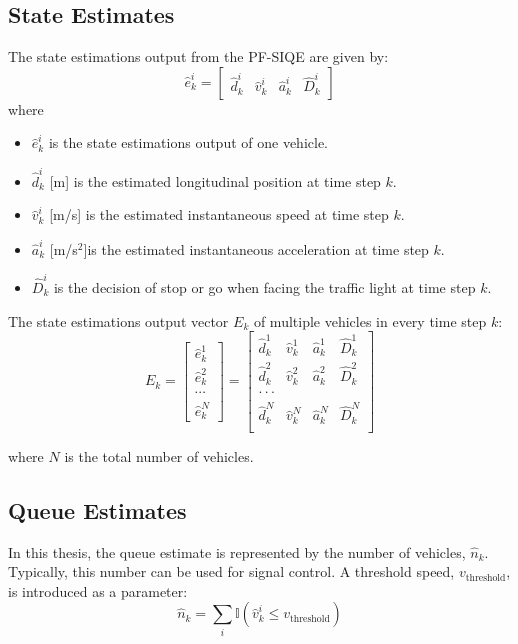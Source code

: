 \subsection{State Estimates}
The state estimations output from the PF-SIQE are given by:
\begin{equation}\label{state estimates}
   \hat{e}_k^i = \begin{bmatrix}
\hat{d}_k^i & \hat{v}_k^i & \hat{a}_k^i & \hat{D}_k^i  
\end{bmatrix}
\end{equation}
where
\begin{itemize}
    \item $\hat{e}_k^i$ is the state estimations output of one vehicle.
    \item \(\hat{d}_k^i\) [m] is the estimated longitudinal position at time step \(k\).
    \item \(\hat{v}_k^i\) [m/s] is the estimated instantaneous speed at time step \(k\).
    \item \(\hat{a}_k^i\) [m/s$^2$]is the estimated instantaneous acceleration at time step \(k\).
    \item $\hat{D}_k^i$ is the decision of stop or go when facing the traffic light at time step \(k\).
\end{itemize}
The state estimations output vector \( E_k \) of multiple vehicles in every time step $k$:
\begin{equation}
    E_k = \begin{bmatrix}
\hat e_k^1 \\
\hat e_k^2 \\
\cdots \\
\hat e_k^N 
\end{bmatrix}
= \begin{bmatrix}
\hat{d}_k^1 & \hat{v}_k^1 & \hat{a}_k^1 & \hat{D}_k^1 \\
\hat{d}_k^2 & \hat{v}_k^2 & \hat{a}_k^2 & \hat{D}_k^2 \\
\text{$\cdot \cdot \cdot $} \\
\hat{d}_k^N & \hat{v}_k^N & \hat{a}_k^N & \hat{D}_k^N \\
\end{bmatrix}
\end{equation}

where \( N \) is the total number of vehicles.

\subsection{Queue Estimates}
In this thesis, the queue estimate is represented by the number of vehicles, \(\hat{n}_k\). Typically, this number can be used for signal control. A threshold speed, \(v_\text{threshold}\), is introduced as a parameter:
\begin{equation}\label{Queue Estimates}
\hat{n}_k = \sum_{i} \mathbb{I}(\hat{v}_{k}^i \leq v_\text{threshold})  
\end{equation}

